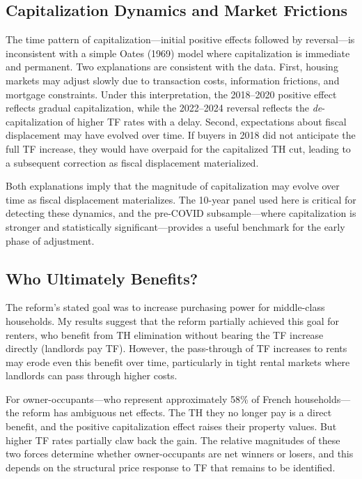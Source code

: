 \documentclass[12pt]{article}
\begin{document}
\subsection{Capitalization Dynamics and Market Frictions}

The time pattern of capitalization---initial positive effects followed by reversal---is inconsistent with a simple Oates (1969) model where capitalization is immediate and permanent. Two explanations are consistent with the data. First, housing markets may adjust slowly due to transaction costs, information frictions, and mortgage constraints. Under this interpretation, the 2018--2020 positive effect reflects gradual capitalization, while the 2022--2024 reversal reflects the \emph{de}-capitalization of higher TF rates with a delay. Second, expectations about fiscal displacement may have evolved over time. If buyers in 2018 did not anticipate the full TF increase, they would have overpaid for the capitalized TH cut, leading to a subsequent correction as fiscal displacement materialized.

Both explanations imply that the magnitude of capitalization may evolve over time as fiscal displacement materializes. The 10-year panel used here is critical for detecting these dynamics, and the pre-COVID subsample---where capitalization is stronger and statistically significant---provides a useful benchmark for the early phase of adjustment.

\subsection{Who Ultimately Benefits?}

The reform's stated goal was to increase purchasing power for middle-class households. My results suggest that the reform partially achieved this goal for renters, who benefit from TH elimination without bearing the TF increase directly (landlords pay TF). However, the pass-through of TF increases to rents may erode even this benefit over time, particularly in tight rental markets where landlords can pass through higher costs.

For owner-occupants---who represent approximately 58\% of French households---the reform has ambiguous net effects. The TH they no longer pay is a direct benefit, and the positive capitalization effect raises their property values. But higher TF rates partially claw back the gain. The relative magnitudes of these two forces determine whether owner-occupants are net winners or losers, and this depends on the structural price response to TF that remains to be identified.
\end{document}
